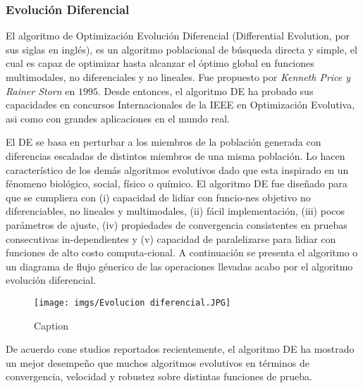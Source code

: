 \documentclass{article}
\begin{document}
\subsubsection{Evoluci\'on Diferencial}
El algoritmo de Optimizaci\'on Evoluci\'on Diferencial (Differential Evolution, por sus siglas en ingl\'es), es un algoritmo poblacional de b\'usqueda directa y simple, el cual es capaz de optimizar hasta alcanzar el \'optimo global en funciones multimodales, no diferenciales y no lineales. Fue propuesto por \textit{Kenneth Price y Rainer Storn} en $1995$. Desde entonces, el algoritmo DE ha probado sus capacidades en concursos Internacionales de la IEEE en Optimizaci\'on Evolutiva, asi como con grandes aplicaciones en el mundo real.

El DE se basa en perturbar a los miembros de la poblaci\'on generada con diferencias escaladas de distintos miembros de una misma poblaci\'on. Lo hacen caracter\'istico de los dem\'as algoritmos evolutivos dado que esta inspirado en un f\'enomeno biol\'ogico, social, f\'isico o qu\'imico. El algoritmo DE fue dise\~nado para que se cumpliera con (i) capacidad de lidiar con funcio-nes objetivo no diferenciables, no lineales y multimodales, (ii) fácil implementación, (iii) pocos parámetros de ajuste, (iv) propiedades de convergencia consistentes en pruebas consecutivas in-dependientes y (v) capacidad de paralelizarse para lidiar con funciones de alto costo computa-cional. A continuaci\'on se presenta el algoritmo o un diagrama de flujo g\'enerico de las operaciones llevadas acabo por el algoritmo evoluci\'on diferencial.
\begin{figure}[h!]
    \centering
    \texttt{[image: imgs/Evolucion diferencial.JPG]}
    \caption{Caption}
    \label{fig:my_label}
\end{figure}
De acuerdo cone studios reportados recientemente, el algoritmo DE ha mostrado un mejor desempe\~no que muchos algoritmos evolutivos en t\'erminos de convergencia, velocidad y robustez sobre distintas funciones de prueba.
\end{document}
